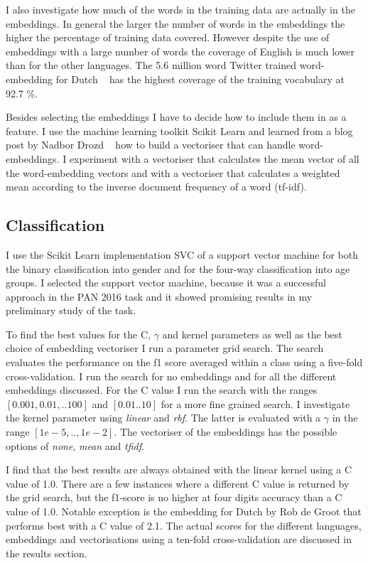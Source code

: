 \documentclass[11pt]{article}
\begin{document}
I also investigate how much of the words in the training data are actually in the embeddings. In general the larger the number of words in the embeddings the higher the percentage of training data covered. However despite the use of embeddings with a large number of words the coverage of English is much lower than for the other languages. The 5.6 million word Twitter trained word-embedding for Dutch ~\cite{rob} has the highest coverage of the training vocabulary at 92.7 \%.

Besides selecting the embeddings I have to decide how to include them in as a feature. I use the machine learning toolkit Scikit Learn \cite{scikit-learn} and learned from a blog post by Nadbor Drozd ~\cite{nadbordrozd} how to build a vectoriser that can handle word-embeddings. I experiment with a vectoriser that calculates the mean vector of all the word-embedding vectors and with a vectoriser that calculates a weighted mean according to the inverse document frequency of a word (tf-idf).

\subsection{Classification}

I use the Scikit Learn implementation SVC of a support vector machine for both the binary classification into gender and for the four-way classification into age groups. I selected the support vector machine, because it was a successful approach in the PAN 2016 task \cite{rangel2016overview} and it showed promising results in my preliminary study of the task.

To find the best values for the C, $\gamma$ and kernel parameters as well as the best choice of embedding vectoriser I run a parameter grid search. The search evaluates the performance on the f1 score averaged within a class using a five-fold cross-validation. I run the search for no embeddings and for all the different embeddings discussed. For the C value I run the search with the ranges $[0.001, 0.01, .. 100]$ and $[0.01 .. 10]$ for a more fine grained search. I investigate the kernel parameter using \emph{linear} and \emph{rbf}. The latter is evaluated with a $\gamma$ in the range $[1e-5, .., 1e-2]$. The vectoriser of the embeddings has the possible options of \emph{none}, \emph{mean} and \emph{tfidf}.

I find that the best results are always obtained with the linear kernel using a C value of 1.0. There are a few instances where a different C value is returned by the grid search, but the f1-score is no higher at four digits accuracy than a C value of 1.0. Notable exception is the embedding for Dutch by Rob de Groot  that performs best with a C value of 2.1. The actual scores for the different languages, embeddings and vectorisations using a ten-fold cross-validation are discussed in the results section.
\end{document}

